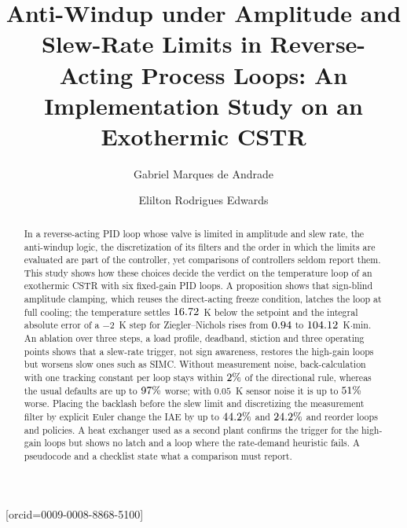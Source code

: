 \documentclass[a4paper,fleqn]{cas-dc}
\begin{document}
\let\WriteBookmarks\relax
\def\floatpagepagefraction{1}
\def\textpagefraction{.001}

\title [mode = title]{Anti-Windup under Amplitude and Slew-Rate Limits in Reverse-Acting Process Loops: An Implementation Study on an Exothermic CSTR}

\author[1]{Gabriel Marques de Andrade}[orcid=0009-0008-8868-5100]
\cormark[1]

\author[1]{Elilton Rodrigues Edwards}



\begin{abstract}
In a reverse-acting PID loop whose valve is limited in amplitude and slew rate, the anti-windup logic, the discretization of its filters and the order in which the limits are evaluated are part of the controller, yet comparisons of controllers seldom report them. This study shows how these choices decide the verdict on the temperature loop of an exothermic CSTR with six fixed-gain PID loops. A proposition shows that sign-blind amplitude clamping, which reuses the direct-acting freeze condition, latches the loop at full cooling; the temperature settles $16.72$~K below the setpoint and the integral absolute error of a $-2$~K step for Ziegler--Nichols rises from $0.94$ to $104.12$~K$\cdot$min. An ablation over three steps, a load profile, deadband, stiction and three operating points shows that a slew-rate trigger, not sign awareness, restores the high-gain loops but worsens slow ones such as SIMC. Without measurement noise, back-calculation with one tracking constant per loop stays within $2\%$ of the directional rule, whereas the usual defaults are up to $97\%$ worse; with $0.05$~K sensor noise it is up to $51\%$ worse. Placing the backlash before the slew limit and discretizing the measurement filter by explicit Euler change the IAE by up to $44.2\%$ and $24.2\%$ and reorder loops and policies. A heat exchanger used as a second plant confirms the trigger for the high-gain loops but shows no latch and a loop where the rate-demand heuristic fails. A pseudocode and a checklist state what a comparison must report.
\end{abstract}
\end{document}
